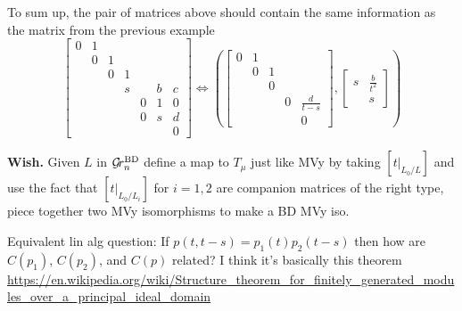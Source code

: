 \documentclass{article}
\begin{document}
\begin{example}
    To sum up, the pair of matrices above should contain the same information as the matrix from the previous example 
    \[
    \begin{bmatrix}
    0 & 1 \\
      & 0 & 1 \\
      &   & 0 & 1 \\
      &   &   & s &  & b & c \\
      &   &   &   & 0 & 1 & 0 \\
      &   &   &   & 0 & s & d \\
      &   &   &   &   &   & 0
    \end{bmatrix} \Leftrightarrow \left( \begin{bmatrix}
            0 & 1\\
              & 0 & 1\\
              &   & 0 &  &  \\
              & & & 0 & \frac d {t-s} \\
              & & & & 0  
        \end{bmatrix} , \begin{bmatrix}
        s & \frac b {t^2} \\ & s 
        \end{bmatrix}\right) 
    \] 
\end{example}

{\bf Wish.} Given $L$ in ${\mathcal G\!r^{\text{BD}}_{n}}$ define a map to $T_\mu$ just like MVy by taking $[t\big|_{L_0/L}]$ and use the fact that $[t\big|_{L_0/L_i}]$ for $i = 1,2$ are companion matrices of the right type, piece together two MVy isomorphisms to make a BD MVy iso. 

Equivalent lin alg question: If $p(t,t-s) = p_1(t)p_2(t-s)$ then how are $C(p_1)$, $C(p_2)$, and $C(p)$ related? I think it's basically this theorem \url{https://en.wikipedia.org/wiki/Structure_theorem_for_finitely_generated_modules_over_a_principal_ideal_domain} 
\end{document}

